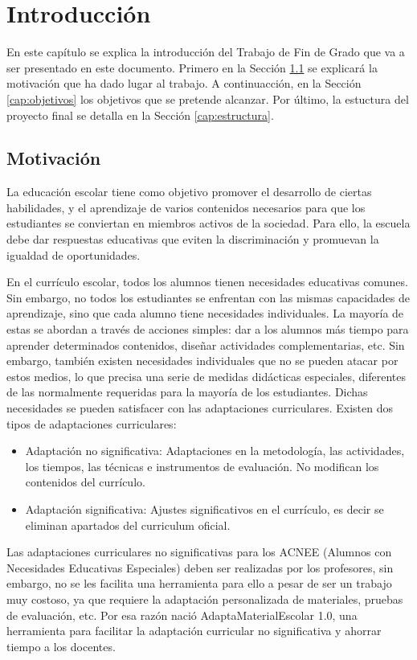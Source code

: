 \chapter{Introducción}
\label{ch:introduccion}

En este capítulo se explica la introducción del Trabajo de Fin de Grado que va a ser presentado en este documento. Primero en la Sección \ref{cap:motivacio} se explicará la motivación que ha dado lugar al trabajo. A continuacción, en la Sección \ref{cap:objetivos} los objetivos que se pretende alcanzar. Por último, la estuctura del proyecto final se detalla en la Sección \ref{cap:estructura}.

\section{Motivación}\label{cap:motivacio}
La educación escolar tiene como objetivo promover el desarrollo de ciertas habilidades, y el aprendizaje de varios contenidos necesarios para que los estudiantes se conviertan en miembros activos de la sociedad. Para ello, la escuela debe dar respuestas educativas que eviten la discriminación y promuevan la igualdad de oportunidades.

En el currículo escolar, todos los alumnos tienen necesidades educativas comunes. Sin embargo, no todos los estudiantes se enfrentan con las mismas capacidades de aprendizaje, sino que cada alumno tiene necesidades individuales. La mayoría de estas se abordan a través de acciones simples: dar a los alumnos más tiempo para aprender determinados contenidos, diseñar actividades complementarias, etc.  Sin embargo, también existen necesidades individuales que no se pueden atacar por estos medios, lo que precisa una serie de medidas didácticas especiales, diferentes de las normalmente requeridas para la mayoría de los estudiantes. Dichas necesidades se pueden satisfacer con las adaptaciones curriculares. Existen dos tipos de adaptaciones curriculares:
\begin{itemize}
    \item Adaptación no significativa: Adaptaciones en la metodología, las actividades, los tiempos,
    las técnicas e instrumentos de evaluación. No modifican los contenidos del currículo.  
    \item Adaptación significativa: Ajustes significativos en el currículo, es decir se eliminan apartados del curriculum oficial. 
\end{itemize}
Las adaptaciones curriculares no significativas para los ACNEE (Alumnos con Necesidades Educativas Especiales) deben ser realizadas por los profesores, sin embargo, no se les facilita una herramienta para ello a pesar de ser un trabajo muy costoso, ya que requiere la adaptación personalizada de materiales, pruebas de evaluación, etc. Por esa razón nació AdaptaMaterialEscolar 1.0, una herramienta para facilitar la adaptación curricular no significativa y ahorrar tiempo a los docentes.

